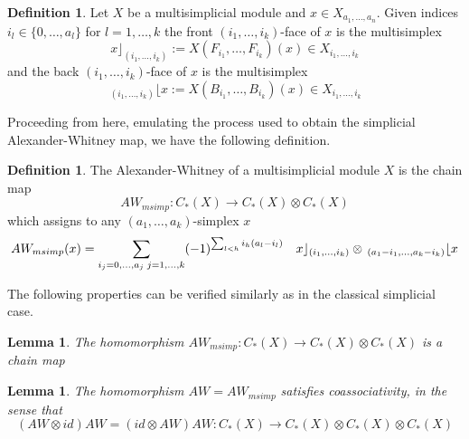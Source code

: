 \documentclass[a4paper,11pt]{article}
\newtheorem{lemma}[theorem]{Lemma}
\theoremstyle{remark}
\theoremstyle{definition}
\newtheorem{definition}[theorem]{Definition}
\begin{document}
\begin{definition}
Let $X$ be a multisimplicial module and $x\in X_{a_{1},\dots,a_{n}}$. 
Given indices  $i_l \in \{0,\dots,a_l\}$ for $l=1,\dots,k$  the front $(i_1,\dots,i_k)$-face of $x$ is the multisimplex
$$x\rfloor_{(i_{1},\dots,i_{k})} := X(F_{i_1},\dots,F_{i_k})(x) \in X_{i_1,\dots,i_k}$$
and the back $(i_1,\dots,i_k)$-face of $x$ is the multisimplex
$$\,_{(i_{1},\dots,i_{k})}\lfloor x := X(B_{i_1},\dots,B_{i_k})(x) \in X_{i_1,\dots,i_k}$$


\end{definition} 

Proceeding from here, emulating the process used to obtain the simplicial Alexander-Whitney map, we have the following definition.
\begin{definition} \label{awm}
The Alexander-Whitney of a multisimplicial module $X$ is the chain map
	\begin{equation*}
	AW_{msimp}:C_{*}(X) \longrightarrow C_{*}(X)\otimes C_{*}(X)
	\end{equation*}
which assigns to any $(a_{1},\dots,a_{k})$-simplex $x$
	\begin{equation*}
	AW_{msimp}(x)= \sum_{ %
	 i_{j}=0,\dots,a_{j} \;  
	 j=1,\dots,k
	}  (-1)^{\sum_{l<h} i_h (a_l-i_l) }	\quad x\rfloor_{(i_{1},\dots,i_{k})} \otimes  \,_{(a_{1}-i_{1},\dots,a_{k}-i_{k})} \lfloor x
	\end{equation*}
\end{definition}
The following properties can be verified similarly as in the classical simplicial case.
\begin{lemma} \label{chain}
The homomorphism $AW_{msimp}:C_*(X) \to C_*(X) \otimes C_*(X)$ is a chain map
\end{lemma}

\begin{lemma} \label{coass}
The homomorphism $AW=AW_{msimp}$ satisfies coassociativity, in the sense that
$$ (AW \otimes id) AW = (id \otimes AW)AW: C_*(X) \to C_*(X) \otimes C_*(X) \otimes C_*(X)$$
\end{lemma}
	
\end{document}
